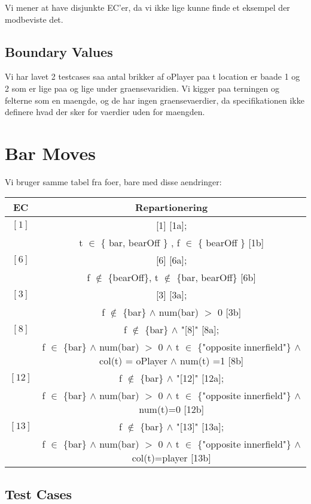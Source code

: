 \documentclass[a4paper]{article}
\begin{document}
Vi mener at have disjunkte EC'er, da vi ikke lige kunne
finde et eksempel der modbeviste det.

\subsection{Boundary Values}
Vi har lavet 2 testcases saa antal brikker af oPlayer paa t location
er baade 1 og 2 som er lige paa og lige under
graensevaridien. Vi kigger paa terningen og felterne som en
maengde, og de har ingen graensevaerdier, da specifikationen ikke
definere hvad der sker for vaerdier uden for maengden.

\section{Bar Moves}
Vi bruger samme tabel fra foer, bare med disse aendringer:

\begin{tabular}{c|c}
EC & Repartionering \\
\toprule
$[1]$ & [1] [1a]; \\
      & t $\in$ \{ bar, bearOff \} , f $\in$ \{ bearOff \}  [1b] \\
\midrule
$[6]$ & [6] [6a]; \\
      & f $\notin$ \{bearOff\}, t $\notin$ \{bar, bearOff\} [6b] \\
\midrule
$[3]$ & [3] [3a]; \\
      & f $\notin$ \{bar\} $\wedge$ num(bar) $>$ 0 [3b] \\
\midrule
$[8]$ & f $\notin$ \{bar\} $\wedge$ "[8]" [8a]; \\
      & f $\in$ \{bar\} $\wedge$ num(bar) $>$ 0 $\wedge$ t $\in$
        \{"opposite innerfield"\} $\wedge$ col(t) = oPlayer $\wedge$
        num(t) =1 [8b] \\
\midrule
$[12]$ & f $\notin$ \{bar\} $\wedge$ "[12]" [12a]; \\
      & f $\in$ \{bar\} $\wedge$ num(bar) $>$ 0 $\wedge$ t $\in$
        \{"opposite innerfield"\} $\wedge$ num(t)=0 [12b] \\
\midrule
$[13]$ & f $\notin$ \{bar\} $\wedge$ "[13]" [13a]; \\
      & f $\in$ \{bar\} $\wedge$ num(bar) $>$ 0 $\wedge$ t $\in$
        \{"opposite innerfield"\} $\wedge$ col(t)=player [13b] \\

\bottomrule
\end{tabular}

\subsection{Test Cases}
\end{document}
